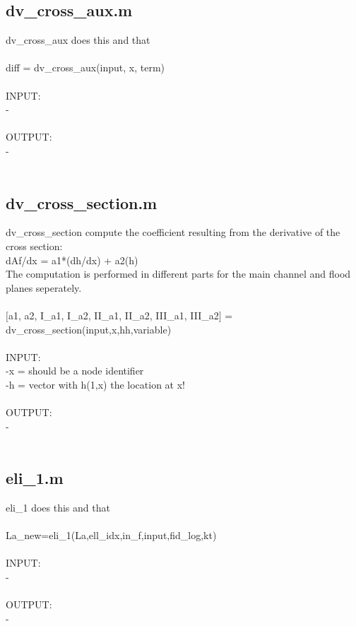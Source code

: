 \subsection{dv\_cross\_aux.m}
dv\_cross\_aux does this and that \\ 
 \\ 
diff = dv\_cross\_aux(input, x, term) \\ 
 \\ 
INPUT: \\ 
   - \\ 
 \\ 
OUTPUT: \\ 
   - \\ 
 \\ 
\subsection{dv\_cross\_section.m}
dv\_cross\_section compute the coefficient resulting from the derivative of the cross section: \\ 
  dAf/dx = a1*(dh/dx) + a2(h) \\ 
The computation is performed in different parts for the main channel and flood planes seperately. \\ 
 \\ 
$[$a1, a2, I\_a1, I\_a2, II\_a1, II\_a2, III\_a1, III\_a2$]$ = dv\_cross\_section(input,x,hh,variable) \\ 
 \\ 
INPUT: \\ 
   -x = should be a node identifier \\ 
   -h = vector with h(1,x) the location at x! \\ 
 \\ 
OUTPUT: \\ 
   - \\ 
 \\ 
\subsection{eli\_1.m}
eli\_1 does this and that \\ 
 \\ 
La\_new=eli\_1(La,ell\_idx,in\_f,input,fid\_log,kt) \\ 
 \\ 
INPUT: \\ 
   - \\ 
 \\ 
OUTPUT: \\ 
   - \\ 
 \\ 
